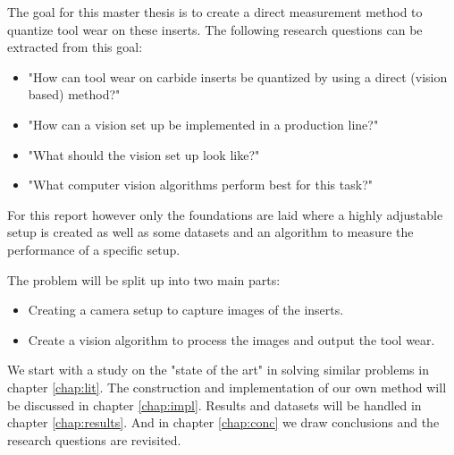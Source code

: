      
     The goal for this master thesis is to create a direct measurement method to quantize tool wear on these inserts. The following research questions can be extracted from this goal: 
     \begin{itemize}
     	\item "How can tool wear on carbide inserts be quantized by using a direct (vision based) method?"
     	\item "How can a vision set up be implemented in a production line?"
     	\item "What should the vision set up look like?"
     	\item "What computer vision algorithms perform best for this task?"
     \end{itemize}
     	
     	
     For this report however only the foundations are laid where a highly adjustable setup is created as well as some datasets and an algorithm to measure the performance of a specific setup.
     
     
The problem will be split up into two main parts: 
	\begin{itemize}
		\item Creating a camera setup to capture images of the inserts.
		\item Create a vision algorithm to process the images and output the tool wear.
	\end{itemize}
	
We start with a study on the "state of the art" in solving similar problems in chapter \ref{chap:lit}. The construction and implementation of our own method will be discussed in chapter \ref{chap:impl}. Results and datasets will be handled in chapter \ref{chap:results}. And in chapter \ref{chap:conc} we draw conclusions and the research questions are revisited.
	
